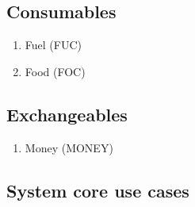 \subsection{Consumables} 
\begin{enumerate}
\item Fuel (FUC)
\item Food (FOC)
\end{enumerate}

\subsection{Exchangeables} 
\begin{enumerate}
\item Money (MONEY)
\end{enumerate}


\subsection{System core use cases}

